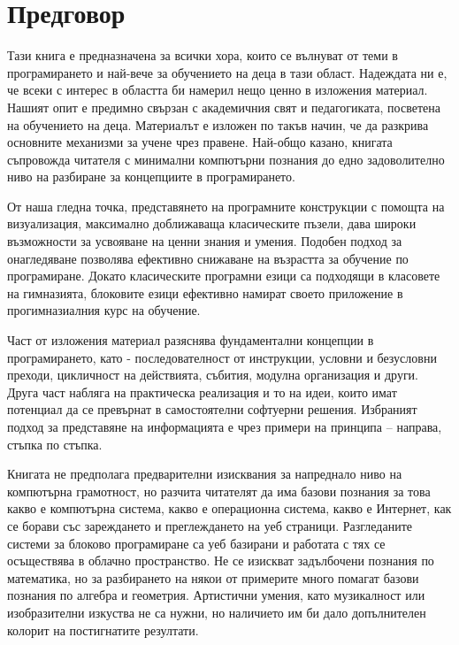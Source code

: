 ﻿
\chapter*{Предговор}
\thispagestyle{empty}

Тази книга е предназначена за всички хора, които се вълнуват от теми в програмирането и най-вече за обучението на деца в тази област. Надеждата ни е, че всеки с интерес в областта би намерил нещо ценно в изложения материал. Нашият опит е предимно свързан с академичния свят и педагогиката, посветена на обучението на деца. Материалът е изложен по такъв начин, че да разкрива основните механизми за учене чрез правене. Най-общо казано, книгата съпровожда читателя с минимални компютърни познания до едно задоволително ниво на разбиране за концепциите в програмирането. 

От наша гледна точка, представянето на програмните конструкции с помощта на визуализация, максимално доближаваща класическите пъзели, дава широки възможности за усвояване на ценни знания и умения. Подобен подход за онагледяване позволява ефективно снижаване на възрастта за обучение по програмиране. Докато класическите програмни езици са подходящи в класовете на гимназията, блоковите езици ефективно намират своето приложение в прогимназиалния курс на обучение. 

Част от изложения материал разяснява фундаментални концепции в програмирането, като - последователност от инструкции, условни и безусловни преходи, цикличност на действията, събития, модулна организация и други. Друга част набляга на практическа реализация и то на идеи, които имат потенциал да се превърнат в самостоятелни софтуерни решения. Избраният подход за представяне на информацията е чрез примери на принципа – направа, стъпка по стъпка. 

Книгата не предполага предварителни изисквания за напреднало ниво на компютърна грамотност, но разчита читателят да има базови познания за това какво е компютърна система, какво е операционна система, какво е Интернет, как се борави със зареждането и преглеждането на уеб страници. Разгледаните системи за блоково програмиране са уеб базирани и работата с тях се осъществява в облачно пространство. Не се изискват задълбочени познания по математика, но за разбирането на някои от примерите много помагат базови познания по алгебра и геометрия. Артистични умения, като музикалност или изобразителни изкуства не са нужни, но наличието им би дало допълнителен колорит на постигнатите резултати. 

